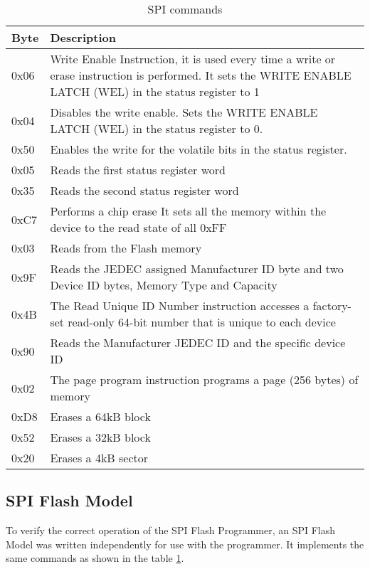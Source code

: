 \begin{table}[h!]
\centering
    \begin{tabular}{ | l | p{12cm} |}
    \hline
    Byte & Description \\ \hline
    0x06 & Write Enable Instruction, it is used every time a write or erase instruction 
    is performed. It sets the WRITE ENABLE LATCH (WEL) in the status register to 1\\ \hline
    0x04 & Disables the write enable. Sets the WRITE ENABLE LATCH (WEL) in the status register to 0.\\ \hline
    0x50 & Enables the write for the volatile bits in the status register.\\ \hline
    0x05 &  Reads the first status register word \\ \hline
    0x35 &  Reads the second status register word\\ \hline
    0xC7  & Performs a chip erase It sets all the memory within the device to the read state of all 0xFF\\ \hline
    0x03 & Reads from the Flash memory\\ \hline
    0x9F & Reads the JEDEC assigned Manufacturer ID byte and two Device ID
    bytes, Memory Type and Capacity \\ \hline
    0x4B & The Read Unique ID Number instruction accesses a factory-set read-only 64-bit number that is unique to
    each device\\ \hline
    0x90 & Reads the Manufacturer JEDEC ID and the specific device ID\\ \hline
    0x02 & The page program instruction programs a page (256 bytes) of memory \\ \hline
    0xD8 & Erases a  64kB block\\ \hline
    0x52 & Erases a 32kB block\\ \hline
    0x20 & Erases a 4kB sector \\ \hline
    \end{tabular}
    \caption{SPI commands}
    \label{tab:spi_commands}
\end{table}


\subsection{SPI Flash Model}
To verify the correct operation of the SPI Flash Programmer, an SPI Flash
Model was written independently for use with the programmer. It implements the same commands as shown in the 
table \ref{tab:spi_commands}.

